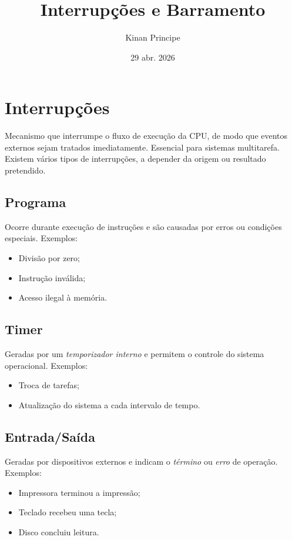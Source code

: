 \documentclass{article}
\title{Interrupções e Barramento}
\author{Kinan Principe}
\date{29 abr. 2026}
\begin{document}
\maketitle
\newpage
\tableofcontents
\newpage

\section{Interrupções}
Mecanismo que interrumpe o fluxo de execução da CPU, de modo que eventos externos sejam tratados imediatamente. \newline
Essencial para sistemas multitarefa.\newline
Existem vários tipos de interrupções, a depender da origem ou resultado pretendido.

\subsection{Programa}
Ocorre durante execução de instruções e são causadas por erros ou condições especiais. Exemplos:

\begin{itemize}
    \item Divisão por zero;
    \item Instrução inválida;
    \item Acesso ilegal à memória.
\end{itemize}

\subsection{Timer}
Geradas por um \emph{temporizador interno} e permitem o controle do sistema operacional. Exemplos:

\begin{itemize}
    \item Troca de tarefas;
    \item Atualização do sistema a cada intervalo de tempo.
\end{itemize}

\subsection{Entrada/Saída}
Geradas por dispositivos externos e indicam o \emph{término} ou \emph{erro} de operação. Exemplos:

\begin{itemize}
    \item Impressora terminou a impressão;
    \item Teclado recebeu uma tecla;
    \item Disco concluiu leitura.
\end{itemize}
\end{document}
